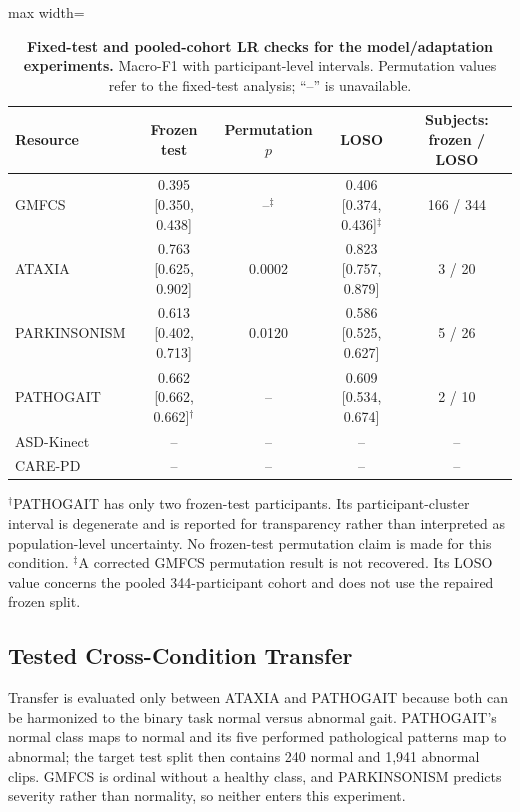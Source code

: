 \begin{table}[H]
\centering
\caption{\textbf{Fixed-test and pooled-cohort LR checks for the model/adaptation experiments.} Macro-F1 with participant-level intervals. Permutation values refer to the fixed-test analysis; ``--'' is unavailable.}
\label{tab:core_loso}
\small
\begin{adjustbox}{max width=\textwidth}
\begin{tabular}{lcccc}
\toprule
Resource
& Frozen test
& Permutation $p$
& LOSO
& Subjects: frozen / LOSO \\
\midrule
GMFCS
& 0.395 [0.350, 0.438]
& --$^{\ddagger}$
& 0.406 [0.374, 0.436]$^{\ddagger}$
& 166 / 344 \\

ATAXIA
& 0.763 [0.625, 0.902]
& 0.0002
& 0.823 [0.757, 0.879]
& 3 / 20 \\

PARKINSONISM
& 0.613 [0.402, 0.713]
& 0.0120
& 0.586 [0.525, 0.627]
& 5 / 26 \\

PATHOGAIT
& 0.662 [0.662, 0.662]$^{\dagger}$
& --
& 0.609 [0.534, 0.674]
& 2 / 10 \\
ASD-Kinect & -- & -- & -- & -- \\
CARE-PD & -- & -- & -- & -- \\
\bottomrule
\end{tabular}
\end{adjustbox}

\vspace{2pt}
\footnotesize
$^{\dagger}$PATHOGAIT has only two frozen-test participants. Its
participant-cluster interval is degenerate and is reported for
transparency rather than interpreted as population-level uncertainty.
No frozen-test permutation claim is made for this condition. $^{\ddagger}$A corrected GMFCS permutation result is not recovered. Its LOSO value concerns the pooled 344-participant cohort and does not use the repaired frozen split.
\end{table}


\subsection{Tested Cross-Condition Transfer}
\label{sec:supp_transfer}

Transfer is evaluated only between ATAXIA and PATHOGAIT because both can be harmonized to the binary task normal versus abnormal gait. PATHOGAIT's normal class maps to normal and its five performed pathological patterns map to abnormal; the target test split then contains 240 normal and 1,941 abnormal clips. GMFCS is ordinal without a healthy class, and PARKINSONISM predicts severity rather than normality, so neither enters this experiment.

